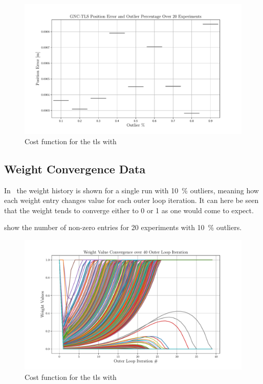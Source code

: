 \begin{figure}[!h]
	\begin{center}
		\includegraphics[width=\textwidth]{chapters/2-pose-estimation/fig/GNC-TLS-t-e.pdf}
	\end{center}
	\caption{Cost function for the \gls{tls} with }
	\label{fig:GNC-TLS-t-e}
\end{figure}

\newpage
\subsection{Weight Convergence Data}\label{sec:weight-convergence-data}

In~ the weight history is shown for a single run with \SI{10}{\percent} outliers, meaning how each weight entry changes value for each outer loop iteration. It can here be seen that the weight tends to converge either to \num{0} or \num{1} as one would come to expect.\medskip

 show the number of non-zero entries for \num{20} experiments with \SI{10}{\percent} outliers.

\begin{figure}[!h]
	\begin{center}
		\includegraphics[width=\textwidth]{chapters/2-pose-estimation/fig/GNC-TLS-w-history-conv.pdf}
	\end{center}
	\caption{Cost function for the \gls{tls} with }
	\label{fig:GNC-TLS-w-history-conv}
\end{figure}

